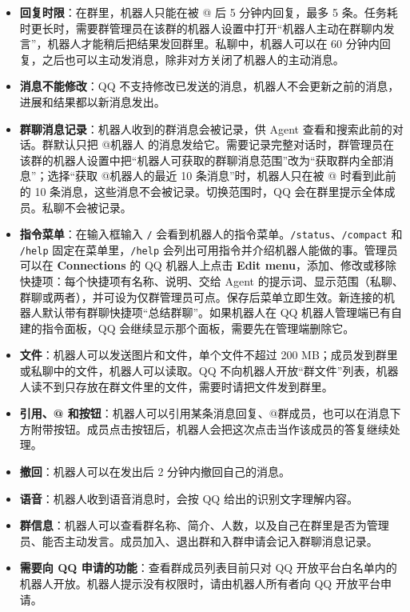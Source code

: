 \documentclass[UTF8,a4paper,11pt]{ctexart}
\begin{document}
\begin{itemize}
  \item \textbf{回复时限}：在群里，机器人只能在被 @ 后 5 分钟内回复，最多 5 条。任务耗时更长时，需要群管理员在该群的机器人设置中打开“机器人主动在群聊内发言”，机器人才能稍后把结果发回群里。私聊中，机器人可以在 60 分钟内回复，之后也可以主动发消息，除非对方关闭了机器人的主动消息。
  \item \textbf{消息不能修改}：QQ 不支持修改已发送的消息，机器人不会更新之前的消息，进展和结果都以新消息发出。
  \item \textbf{群聊消息记录}：机器人收到的群消息会被记录，供 Agent 查看和搜索此前的对话。群默认只把 @机器人 的消息发给它。需要记录完整对话时，群管理员在该群的机器人设置中把“机器人可获取的群聊消息范围”改为“获取群内全部消息”；选择“获取 @机器人的最近 10 条消息”时，机器人只在被 @ 时看到此前的 10 条消息，这些消息不会被记录。切换范围时，QQ 会在群里提示全体成员。私聊不会被记录。
  \item \textbf{指令菜单}：在输入框输入 \texttt{/} 会看到机器人的指令菜单。\texttt{/status}、\texttt{/compact} 和 \texttt{/help} 固定在菜单里，\texttt{/help} 会列出可用指令并介绍机器人能做的事。管理员可以在 \textbf{Connections} 的 QQ 机器人上点击 \textbf{Edit menu}，添加、修改或移除快捷项：每个快捷项有名称、说明、交给 Agent 的提示词、显示范围（私聊、群聊或两者），并可设为仅群管理员可点。保存后菜单立即生效。新连接的机器人默认带有群聊快捷项“总结群聊”。如果机器人在 QQ 机器人管理端已有自建的指令面板，QQ 会继续显示那个面板，需要先在管理端删除它。
  \item \textbf{文件}：机器人可以发送图片和文件，单个文件不超过 200 MB；成员发到群里或私聊中的文件，机器人可以读取。QQ 不向机器人开放“群文件”列表，机器人读不到只存放在群文件里的文件，需要时请把文件发到群里。
  \item \textbf{引用、@ 和按钮}：机器人可以引用某条消息回复、@群成员，也可以在消息下方附带按钮。成员点击按钮后，机器人会把这次点击当作该成员的答复继续处理。
  \item \textbf{撤回}：机器人可以在发出后 2 分钟内撤回自己的消息。
  \item \textbf{语音}：机器人收到语音消息时，会按 QQ 给出的识别文字理解内容。
  \item \textbf{群信息}：机器人可以查看群名称、简介、人数，以及自己在群里是否为管理员、能否主动发言。成员加入、退出群和入群申请会记入群聊消息记录。
  \item \textbf{需要向 QQ 申请的功能}：查看群成员列表目前只对 QQ 开放平台白名单内的机器人开放。机器人提示没有权限时，请由机器人所有者向 QQ 开放平台申请。
\end{itemize}
\end{document}
